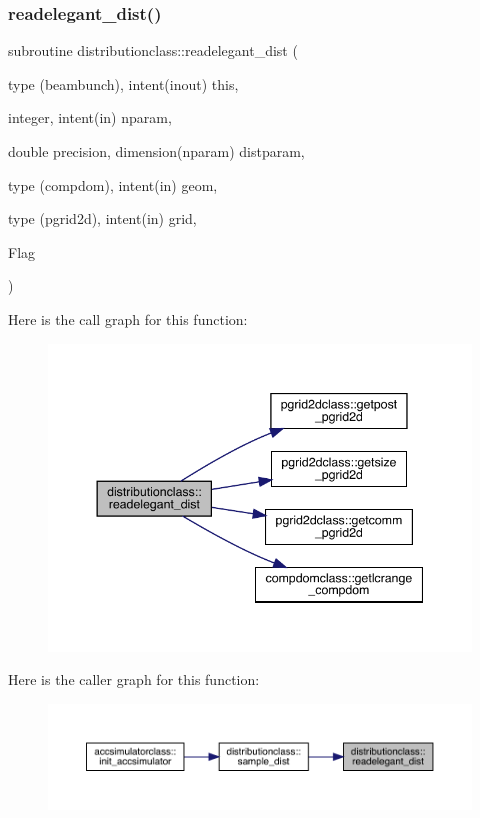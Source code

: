 \subsubsection{\texorpdfstring{readelegant\_dist()}{readelegant\_dist()}}
{\footnotesize\ttfamily subroutine distributionclass\+::readelegant\+\_\+dist (\begin{DoxyParamCaption}\item[{type (beambunch), intent(inout)}]{this,  }\item[{integer, intent(in)}]{nparam,  }\item[{double precision, dimension(nparam)}]{distparam,  }\item[{type (compdom), intent(in)}]{geom,  }\item[{type (pgrid2d), intent(in)}]{grid,  }\item[{}]{Flag }\end{DoxyParamCaption})}

Here is the call graph for this function\+:\nopagebreak
\begin{figure}[H]
\begin{center}
\leavevmode
\includegraphics[width=344pt]{namespacedistributionclass_acf080fd52aac8287d955bcfd88362c07_cgraph}
\end{center}
\end{figure}
Here is the caller graph for this function\+:\nopagebreak
\begin{figure}[H]
\begin{center}
\leavevmode
\includegraphics[width=350pt]{namespacedistributionclass_acf080fd52aac8287d955bcfd88362c07_icgraph}
\end{center}
\end{figure}
\mbox{\label{namespacedistributionclass_aed89b043090c1817fc57baaa9604eb73}} 
